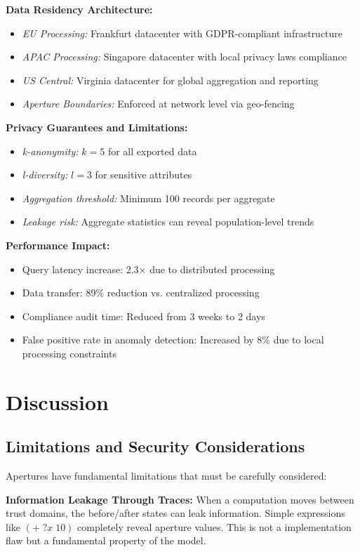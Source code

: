 \documentclass[12pt]{article}
\begin{document}
\textbf{Data Residency Architecture:}
\begin{itemize}
  \item \textit{EU Processing:} Frankfurt datacenter with GDPR-compliant infrastructure
  \item \textit{APAC Processing:} Singapore datacenter with local privacy laws compliance
  \item \textit{US Central:} Virginia datacenter for global aggregation and reporting
  \item \textit{Aperture Boundaries:} Enforced at network level via geo-fencing
\end{itemize}

\textbf{Privacy Guarantees and Limitations:}
\begin{itemize}
  \item \textit{k-anonymity:} $k=5$ for all exported data
  \item \textit{l-diversity:} $l=3$ for sensitive attributes
  \item \textit{Aggregation threshold:} Minimum 100 records per aggregate
  \item \textit{Leakage risk:} Aggregate statistics can reveal population-level trends
\end{itemize}

\textbf{Performance Impact:}
\begin{itemize}
  \item Query latency increase: 2.3× due to distributed processing
  \item Data transfer: 89\% reduction vs. centralized processing
  \item Compliance audit time: Reduced from 3 weeks to 2 days
  \item False positive rate in anomaly detection: Increased by 8\% due to local processing constraints
\end{itemize}

\section{Discussion}

\subsection{Limitations and Security Considerations}

Apertures have fundamental limitations that must be carefully considered:

\textbf{Information Leakage Through Traces:} When a computation moves between trust domains, the before/after states can leak information. Simple expressions like $(+ \; ?x \; 10)$ completely reveal aperture values. This is not a implementation flaw but a fundamental property of the model.
\end{document}
